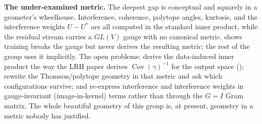 \textbf{The under-examined metric.} The deepest gap is conceptual and squarely in a geometer's wheelhouse. Interference, coherence, polytope angles, kurtosis, and the interference weights $U-U^{*}$ are all computed in the standard inner product, while the residual stream carries a $GL(V)$ gauge with no canonical metric. \textcite{privileged-bases-residual-stream} shows training breaks the gauge but never derives the resulting metric; the rest of the group uses it implicitly. The open problems: derive the data-induced inner product the way the LRH paper derives $\operatorname{Cov}(\gamma)^{-1}$ for the output space (\textcite{linear-representation-hypothesis-geometry}); rewrite the Thomson/polytope geometry in that metric and ask which configurations survive; and re-express interference and interference weights in gauge-invariant (image-in-kernel) terms rather than through the $G=I$ Gram matrix. The whole beautiful geometry of this group is, at present, geometry in a metric nobody has justified.


\printbibliography

